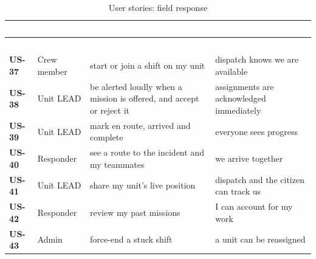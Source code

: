{\tabfont\rowband
\begin{longtable}{@{}>{\raggedright\arraybackslash}p{}>{\raggedright\arraybackslash}p{}>{\raggedright\arraybackslash}p{}>{\raggedright\arraybackslash}p{}@{}}
\caption{User stories: field response}\label{tab:us-fld}\\
\rowcolor{najdanavy}\textcolor{white}{\sffamily\bfseries\small ID} & \textcolor{white}{\sffamily\bfseries\small As a\ldots{}} & \textcolor{white}{\sffamily\bfseries\small I want to\ldots{}} & \textcolor{white}{\sffamily\bfseries\small So that\ldots{}}\\
\endfirsthead
\rowcolor{najdanavy}\textcolor{white}{\sffamily\bfseries\small ID} & \textcolor{white}{\sffamily\bfseries\small As a\ldots{}} & \textcolor{white}{\sffamily\bfseries\small I want to\ldots{}} & \textcolor{white}{\sffamily\bfseries\small So that\ldots{}}\\
\endhead
\bottomrule\endlastfoot
\textbf{US-37} & Crew member & start or join a shift on my unit & dispatch knows we are available\\
\textbf{US-38} & Unit LEAD & be alerted loudly when a mission is offered, and accept or reject it & assignments are acknowledged immediately\\
\textbf{US-39} & Unit LEAD & mark en route, arrived and complete & everyone sees progress\\
\textbf{US-40} & Responder & see a route to the incident and my teammates & we arrive together\\
\textbf{US-41} & Unit LEAD & share my unit’s live position & dispatch and the citizen can track us\\
\textbf{US-42} & Responder & review my past missions & I can account for my work\\
\textbf{US-43} & Admin & force-end a stuck shift & a unit can be reassigned\\
\end{longtable}}
